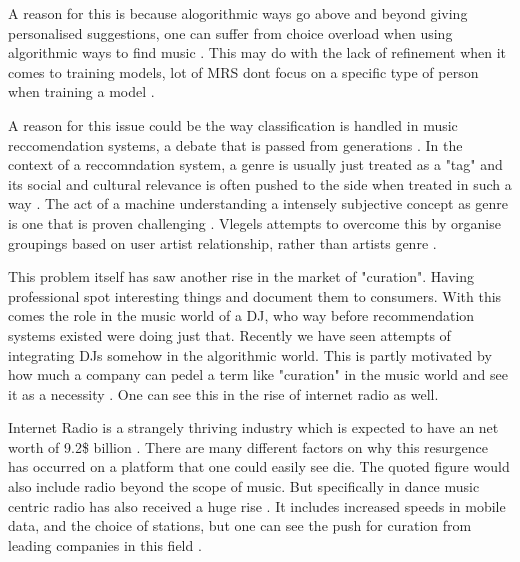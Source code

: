 A reason for this is because alogorithmic ways go above and beyond giving personalised suggestions, one can suffer from choice overload when using algorithmic ways to find music \citep{iyengar_rethinking_1999}. This may do with the lack of refinement when it comes to training models, lot of MRS dont focus on a specific type of person when training a model \citep{laplante_improving_2014}.

A reason for this issue could be the way classification is handled in music reccomendation systems, a debate that is passed from generations \citep{moles_sociodynamique_2019} \citep{dimaggio_classification_1987} \citep{bourdieu_distinction_2010}. In the context of a reccomndation system, a genre is usually just treated as a "tag" and its social and cultural relevance is often pushed to the side when treated in such a way \citep{porcaro_diversity_2021}. The act of a machine understanding a intensely subjective concept as genre is one that is proven challenging \citep{nurnberger_survey_2014}. Vlegels attempts to overcome this by organise groupings based on user artist relationship, rather than artists genre \citep{vlegels_music_2017}.

This problem itself has saw another rise in the market of "curation". Having professional spot interesting things and document them to consumers. With this comes the role in the music world of a DJ, who way before recommendation systems existed were doing just that. Recently we have seen attempts of integrating DJs somehow in the algorithmic world. This is partly motivated by how much a company can pedel a term like "curation" in the music world and see it as a necessity \citep{barna_perfect_2017}. One can see this in the rise of internet radio as well.

Internet Radio is a strangely thriving industry which is expected to have an net worth of 9.2\$ billion \citep{market_research_future_internet_2022}. There are many different factors on why this resurgence has occurred on a platform that one could easily see die. The quoted figure would also include radio beyond the scope of music. But specifically in dance music centric radio has also received a huge rise \citep{gillett_how_2021}. It includes increased speeds in mobile data, and the choice of stations, but one can see the push for curation from leading companies in this field \citep{deane_media_apple_2020} \citep{nts_radio_nts_2023}.

